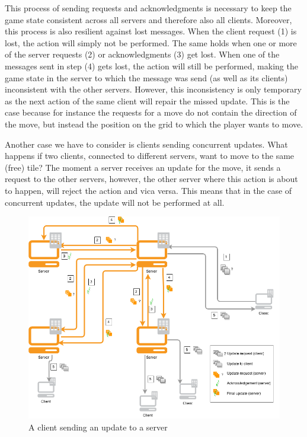 This process of sending requests and acknowledgments is necessary to keep the game state consistent across all servers and therefore also all clients. Moreover, this process is also resilient against lost messages. When the client request (1) is lost, the action will simply not be performed. The same holds when one or more of the server requests (2) or acknowledgments (3) get lost. When one of the messages sent in step (4) gets lost, the action will still be performed, making the game state in the server to which the message was send (as well as its clients) inconsistent with the other servers. However, this inconsistency is only temporary as the next action of the same client will repair the missed update. This is the case because for instance the requests for a move do not contain the direction of the move, but instead the position on the grid to which the player wants to move.

Another case we have to consider is clients sending concurrent updates. What happens if two clients, connected to different servers, want to move to the same (free) tile? The moment a server receives an update for the move, it sends a request to the other servers, however, the other server where this action is about to happen, will reject the action and vica versa. This means that in the case of concurrent updates, the update will not be performed at all.

\begin{figure}[h!]
  \centering
    \includegraphics[width=\textwidth]{diagrams/game-update}
    
  \caption{A client sending an update to a server}
  \label{fig:update_diagram}
\end{figure}


